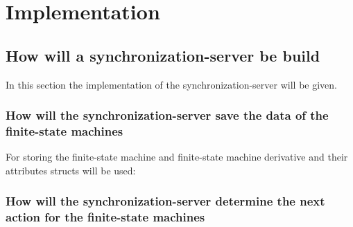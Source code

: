 \hypertarget{implementation}{%
\section{Implementation}\label{implementation}}

\hypertarget{how-will-a-synchronization-server-be-build}{%
\subsection{How will a synchronization-server be
build}\label{how-will-a-synchronization-server-be-build}}

In this section the implementation of the synchronization-server will be
given.

\hypertarget{how-will-the-synchronization-server-save-the-data-of-the-finite-state-machines}{%
\subsubsection{How will the synchronization-server save the data of the
finite-state
machines}\label{how-will-the-synchronization-server-save-the-data-of-the-finite-state-machines}}

For storing the finite-state machine and finite-state machine derivative
and their attributes structs will be used:

\begin{Shaded}
\begin{Highlighting}[]
 
\NormalTok{\{}

 
\NormalTok{\{}
\end{Highlighting}
\end{Shaded}

\hypertarget{how-will-the-synchronization-server-determine-the-next-action-for-the-finite-state-machines}{%
\subsubsection{How will the synchronization-server determine the next
action for the finite-state
machines}\label{how-will-the-synchronization-server-determine-the-next-action-for-the-finite-state-machines}}

